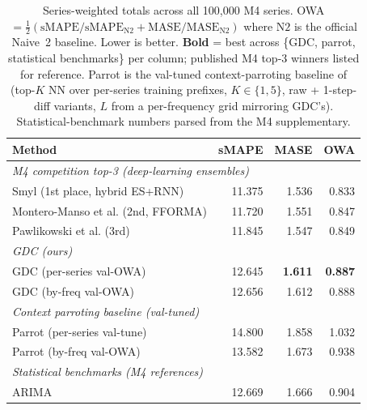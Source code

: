 \begin{table}[t]
\centering
\caption{Series-weighted totals across all 100{,}000 M4 series. OWA $= \tfrac{1}{2}(\text{sMAPE}/\text{sMAPE}_{\text{N2}} + \text{MASE}/\text{MASE}_{\text{N2}})$ where $\text{N2}$ is the official Naive~2 baseline. Lower is better. \textbf{Bold} = best across \{GDC, parrot, statistical benchmarks\} per column; published M4 top-3 winners listed for reference. Parrot is the val-tuned context-parroting baseline of \citet{zhang2025parrot} (top-$K$ NN over per-series training prefixes, $K\in\{1,5\}$, raw + 1-step-diff variants, $L$ from a per-frequency grid mirroring GDC's). Statistical-benchmark numbers parsed from the M4 supplementary.}
\label{tab:m4_overall}
\begin{tabular}{l r r r}
\toprule
Method & sMAPE & MASE & OWA \\
\midrule
\multicolumn{4}{l}{\emph{M4 competition top-3 (deep-learning ensembles)}} \\
Smyl (1st place, hybrid ES+RNN)        & 11.375 & 1.536 & 0.833 \\
Montero-Manso et al. (2nd, FFORMA)     & 11.720 & 1.551 & 0.847 \\
Pawlikowski et al. (3rd)               & 11.845 & 1.547 & 0.849 \\
\midrule
\multicolumn{4}{l}{\emph{GDC (ours)}} \\
GDC (per-series val-OWA)               & 12.645          & \textbf{1.611} & \textbf{0.887} \\
GDC (by-freq val-OWA)                  & 12.656          & 1.612          & 0.888 \\
\midrule
\multicolumn{4}{l}{\emph{Context parroting baseline (val-tuned)}} \\
Parrot (per-series val-tune)           & 14.800 & 1.858 & 1.032 \\
Parrot (by-freq val-OWA)               & 13.582 & 1.673 & 0.938 \\
\midrule
\multicolumn{4}{l}{\emph{Statistical benchmarks (M4 references)}} \\
ARIMA                                  & 12.669 & 1.666 & 0.904 \\

\end{tabular}
\end{table}
